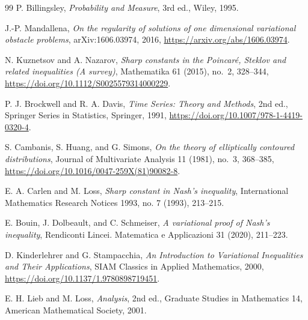 \documentclass[11pt]{amsart}
\theoremstyle{definition}
\theoremstyle{remark}
\begin{document}
\begin{thebibliography}{99}
P. Billingsley, \emph{Probability and Measure}, 3rd ed., Wiley, 1995.

J.-P. Mandallena,
\emph{On the regularity of solutions of one dimensional variational obstacle problems},
arXiv:1606.03974, 2016,
\url{https://arxiv.org/abs/1606.03974}.

N. Kuznetsov and A. Nazarov,
\emph{Sharp constants in the Poincaré, Steklov and related inequalities (A survey)},
Mathematika 61 (2015), no.~2, 328--344,
\url{https://doi.org/10.1112/S0025579314000229}.

P. J. Brockwell and R. A. Davis,
\emph{Time Series: Theory and Methods}, 2nd ed.,
Springer Series in Statistics, Springer, 1991,
\url{https://doi.org/10.1007/978-1-4419-0320-4}.

S. Cambanis, S. Huang, and G. Simons,
\emph{On the theory of elliptically contoured distributions},
Journal of Multivariate Analysis 11 (1981), no.~3, 368--385,
\url{https://doi.org/10.1016/0047-259X(81)90082-8}.

E. A. Carlen and M. Loss,
\emph{Sharp constant in Nash's inequality},
International Mathematics Research Notices 1993, no. 7 (1993), 213--215.

E. Bouin, J. Dolbeault, and C. Schmeiser,
\emph{A variational proof of Nash's inequality},
Rendiconti Lincei. Matematica e Applicazioni 31 (2020), 211--223.

D. Kinderlehrer and G. Stampacchia,
\emph{An Introduction to Variational Inequalities and Their Applications},
SIAM Classics in Applied Mathematics, 2000,
\url{https://doi.org/10.1137/1.9780898719451}.

E. H. Lieb and M. Loss,
\emph{Analysis}, 2nd ed., Graduate Studies in Mathematics 14,
American Mathematical Society, 2001.
\end{thebibliography}
\end{document}
